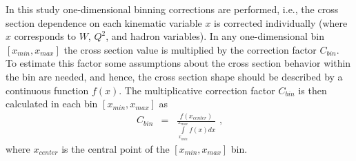 In this study one-dimensional binning corrections are performed, i.e., the cross section dependence on each kinematic variable $x$ is corrected individually (where $x$ corresponds to $W$, $Q^{2}$, and hadron variables). In any one-dimensional bin $[x_{min},x_{max}]$ the cross section value is multiplied by the correction factor $C_{bin}$. To estimate this factor some assumptions about the cross section behavior within the bin are needed, and hence, the cross section shape should be described by a continuous function $f(x)$. The multiplicative correction factor $C_{bin}$ is then calculated in each bin $[x_{min},x_{max}]$ as
\begin{equation}
\begin{aligned}
\label{eq:bincor}
C_{bin} & = &\frac{f(x_{center})}{\int\limits_{x_{min}}^{x_{max}} f(x)dx} \textrm{ ,}
\end{aligned}  
\end{equation}
where $x_{center}$ is the central point of the $[x_{min},x_{max}]$ bin.






